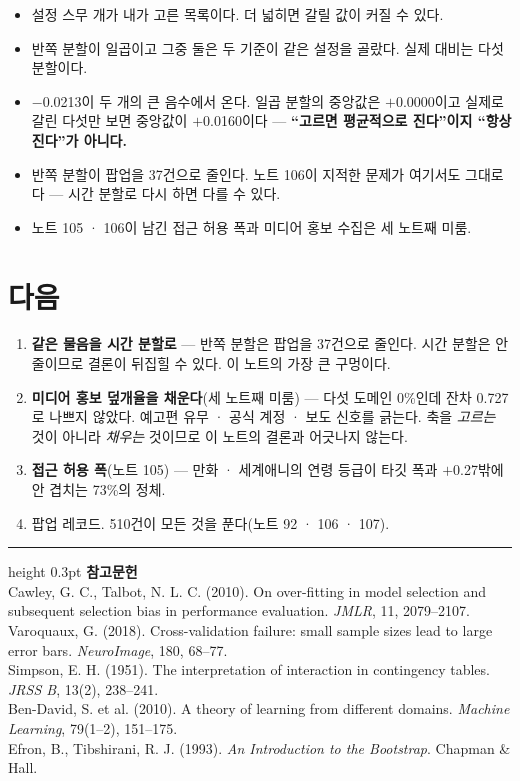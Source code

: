 \documentclass[10pt]{article}
\begin{document}
\begin{itemize}[leftmargin=1.1em,itemsep=0.15em]
\item 설정 스무 개가 내가 고른 목록이다. 더 넓히면 갈릴 값이 커질 수 있다.
\item 반쪽 분할이 일곱이고 그중 둘은 두 기준이 같은 설정을 골랐다. 실제
      대비는 다섯 분할이다.
\item $-$0.0213이 두 개의 큰 음수에서 온다. 일곱 분할의 중앙값은 $+$0.0000이고
      실제로 갈린 다섯만 보면 중앙값이 $+$0.0160이다 --- \textbf{``고르면
      평균적으로 진다''이지 ``항상 진다''가 아니다.}
\item 반쪽 분할이 팝업을 37건으로 줄인다. 노트 106이 지적한 문제가 여기서도
      그대로다 --- 시간 분할로 다시 하면 다를 수 있다.
\item 노트 105 · 106이 남긴 접근 허용 폭과 미디어 홍보 수집은 세 노트째 미룸.
\end{itemize}

\section{다음}

\begin{enumerate}[leftmargin=1.3em,itemsep=0.15em]
\item \textbf{같은 물음을 시간 분할로} --- 반쪽 분할은 팝업을 37건으로 줄인다.
      시간 분할은 안 줄이므로 결론이 뒤집힐 수 있다. 이 노트의 가장 큰 구멍이다.
\item \textbf{미디어 홍보 덮개율을 채운다}(세 노트째 미룸) --- 다섯 도메인
      0\%인데 잔차 0.727로 나쁘지 않았다. 예고편 유무 · 공식 계정 · 보도
      신호를 긁는다. 축을 \emph{고르는} 것이 아니라 \emph{채우는} 것이므로
      이 노트의 결론과 어긋나지 않는다.
\item \textbf{접근 허용 폭}(노트 105) --- 만화 · 세계애니의 연령 등급이 타깃
      폭과 $+$0.27밖에 안 겹치는 73\%의 정체.
\item 팝업 레코드. 510건이 모든 것을 푼다(노트 92 · 106 · 107).
\end{enumerate}

\vspace{0.6em}
\hrule height 0.3pt
\vspace{0.5em}
{\footnotesize
\textbf{참고문헌}\\[0.3em]
Cawley, G. C., Talbot, N. L. C. (2010). On over-fitting in model selection and
subsequent selection bias in performance evaluation. \emph{JMLR}, 11, 2079--2107.\\[0.15em]
Varoquaux, G. (2018). Cross-validation failure: small sample sizes lead to large
error bars. \emph{NeuroImage}, 180, 68--77.\\[0.15em]
Simpson, E. H. (1951). The interpretation of interaction in contingency tables.
\emph{JRSS B}, 13(2), 238--241.\\[0.15em]
Ben-David, S. et al. (2010). A theory of learning from different domains.
\emph{Machine Learning}, 79(1--2), 151--175.\\[0.15em]
Efron, B., Tibshirani, R. J. (1993). \emph{An Introduction to the Bootstrap}.
Chapman \& Hall.
}
\end{document}
